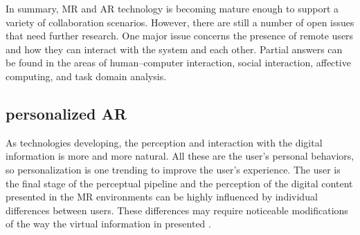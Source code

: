 In summary, MR and AR technology is becoming mature enough to support a variety of collaboration scenarios. However, there are still a number of open issues that need further research. One major issue concerns the presence of remote users and how they can interact with the system and each other. Partial answers can be found in the areas of human–computer interaction, social interaction, affective computing, and task domain analysis.  


\subsection{personalized AR} %
As technologies developing, the perception and interaction with the digital information is more and more natural. All these are the user's personal behaviors, so personalization is one trending to improve the user's experience.
The user is the final stage of the perceptual pipeline and the perception of the digital content presented in the MR environments can be highly influenced by individual differences between users. These differences may require noticeable modifications of the way the virtual information in presented \cite{Kruijff2010b}.


